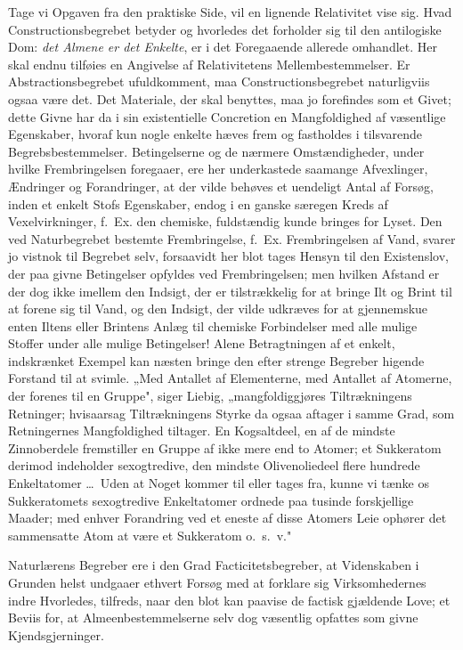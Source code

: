 \documentclass[12pt]{book}
\newcommand{\opage}[1]{\marginnote{\footnotesize\textit{[#1]}}}
\begin{document}
Tage vi Opgaven fra den praktiske Side, vil en lignende Relativitet vise sig. Hvad
Constructionsbegrebet betyder og hvorledes det forholder sig til den antilogiske Dom: \emph{det
Almene er det Enkelte}, er i det Foregaaende allerede omhandlet. Her skal endnu tilføies en
Angivelse af Relativitetens Mellembestemmelser. Er Abstractionsbegrebet ufuldkomment, maa
Constructionsbegrebet naturligviis ogsaa være det. Det Materiale, der skal benyttes, maa jo
forefindes som et Givet; dette Givne har da i sin existentielle Concretion en
\opage{198} Mangfoldighed af væsentlige Egenskaber, hvoraf kun nogle enkelte hæves frem og fastholdes i
tilsvarende Begrebsbestemmelser. Betingelserne og de nærmere Omstændigheder, under hvilke
Frembringelsen foregaaer, ere her underkastede saamange Afvexlinger, Ændringer og Forandringer, at
der vilde behøves et uendeligt Antal af Forsøg, inden et enkelt Stofs Egenskaber, endog i en
ganske særegen Kreds af Vexelvirkninger, f.\ Ex. den chemiske, fuldstændig kunde bringes for
Lyset. Den ved Naturbegrebet bestemte Frembringelse, f.\ Ex. Frembringelsen af Vand, svarer jo
vistnok til Begrebet selv, forsaavidt her blot tages Hensyn til den Existenslov, der paa givne
Betingelser opfyldes ved Frembringelsen; men hvilken Afstand er der dog ikke imellem den Indsigt,
der er tilstrækkelig for at bringe Ilt og Brint til at forene sig til Vand, og den Indsigt, der
vilde udkræves for at gjennemskue enten Iltens eller Brintens Anlæg til chemiske Forbindelser med
alle mulige Stoffer under alle mulige Betingelser! Alene Betragtningen af et enkelt, indskrænket
Exempel kan næsten bringe den efter strenge Begreber higende Forstand til at svimle. „Med Antallet
af Elementerne, med Antallet af Atomerne, der forenes til en Gruppe", siger Liebig,
„mangfoldiggjøres Tiltrækningens Retninger; hvisaarsag Tiltrækningens Styrke da ogsaa aftager i
samme Grad, som Retningernes Mangfoldighed tiltager. En Kogsaltdeel, en af de mindste Zinnoberdele
fremstiller en Gruppe af ikke mere end to Atomer; et Sukkeratom derimod indeholder sexogtredive,
den mindste Olivenoliedeel flere hundrede Enkeltatomer \dots\ Uden at Noget kommer til eller tages
fra, kunne vi tænke os Sukkeratomets sexogtredive Enkeltatomer ordnede paa tusinde forskjellige
Maader; med enhver Forandring ved et eneste af disse Atomers Leie ophører det sammensatte Atom at
være et Sukkeratom o.\ s.\ v."

Naturlærens Begreber ere i den Grad Facticitetsbegreber, at Videnskaben i Grunden helst undgaaer
ethvert Forsøg med
\opage{199} at forklare sig Virksomhedernes indre Hvorledes, tilfreds, naar den blot kan paavise de factisk
gjældende Love; et Beviis for, at Almeenbestemmelserne selv dog væsentlig opfattes som givne
Kjendsgjerninger.
\end{document}
